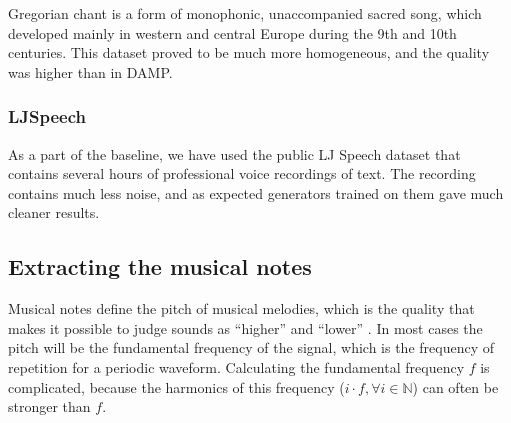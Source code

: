 \documentclass{article}
\begin{document}
Gregorian chant is a form of monophonic, unaccompanied sacred song, which developed mainly in western and central Europe during the 9th and 10th centuries. %
This dataset proved to be much more homogeneous, and the quality was higher than in DAMP.

\subsubsection*{LJSpeech}
As a part of the baseline, we have used the public LJ Speech dataset \cite{ito2017lj} that contains several hours of professional voice recordings of text.
The recording contains much less noise, and as expected generators trained on them gave much cleaner results.

\subsection*{Extracting the musical notes}	
Musical notes define the pitch of musical melodies, which is the quality that makes it possible to judge sounds as ``higher'' and ``lower'' \cite{plack2005pitch}.
In most cases the pitch will be the fundamental frequency of the signal, which is the frequency of repetition for a periodic waveform.
Calculating the fundamental frequency $f$ is complicated, because the harmonics of this frequency ($i \cdot f, \forall i \in \mathbb{N}$) can often be stronger than $f$.
\end{document}
